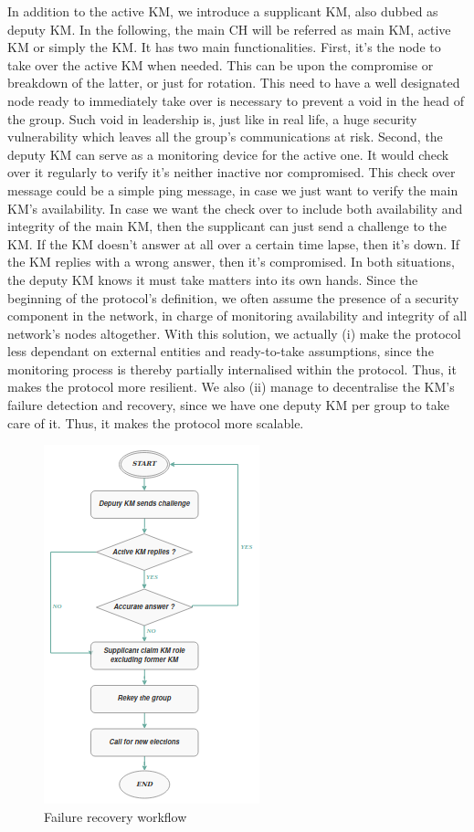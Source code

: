In addition to the active KM, we introduce a supplicant KM, also dubbed as deputy KM. In the following, the main CH will be referred as main KM, active KM or simply the KM. It has two main functionalities. First, it’s the node to take over the active KM when needed. This can be upon the compromise or breakdown of the latter, or just for rotation. This need to have a well designated node ready to immediately take over is necessary to prevent a void in the head of the group. Such void in leadership is, just like in real life, a huge security vulnerability which leaves all the group’s communications at risk. Second, the deputy KM can serve as a monitoring device for the active one. It would check over it regularly to verify it’s neither inactive nor compromised. This check over message could be a simple ping message, in case we just want to verify the main KM’s availability. In case we want the check over to include both availability and integrity of the main KM, then the supplicant can just send a challenge to the KM. If the KM doesn’t answer at all over a certain time lapse, then it’s down. If the KM replies with a wrong answer, then it’s compromised. In both situations, the deputy KM knows it must take matters into its own hands. Since the beginning of the protocol’s definition, we often assume the presence of a security component in the network, in charge of monitoring availability and integrity of all network’s nodes altogether. With this solution, we actually (i) make the protocol less dependant on external entities and ready-to-take assumptions, since the monitoring process is thereby partially internalised within the protocol. Thus, it makes the protocol more resilient. We also (ii) manage to decentralise the KM’s failure detection and recovery, since we have one deputy KM per group to take care of it. Thus, it makes the protocol more scalable.

\begin{figure}[htbp]
	\centerline{\includegraphics[scale=0.72]{figures/recovery_workflow.png}}
	\caption{Failure recovery workflow}
	\label{fig:recovery_workflow}
\end{figure}

